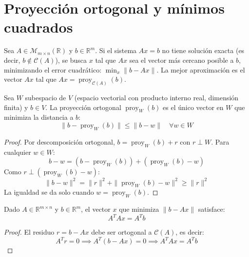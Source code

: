 \section{Proyección ortogonal y mínimos cuadrados}

\begin{definition}
Sea $A \in \mathcal{M}_{m \times n}(\mathbb{R})$ y $b \in \mathbb{R}^m$. Si el sistema $Ax = b$ no tiene solución exacta (es decir, $b \notin \mathcal{C}(A)$), se busca $x$ tal que $Ax$ sea el vector más cercano posible a $b$, minimizando el error cuadrático: \(
\min_{x} \|b - Ax\|
.\) La mejor aproximación es el vector $Ax$ tal que $Ax = \operatorname{proy}_{\mathcal{C}(A)}(b)$.
\end{definition}

\begin{theorem}
Sea $W$ subespacio de $V$ (espacio vectorial con producto interno real, dimensión finita) y $b \in V$. La proyección ortogonal $\operatorname{proy}_W(b)$ es el único vector en $W$ que minimiza la distancia a $b$:
\[
\|b - \operatorname{proy}_W(b)\| \leq \|b - w\| \quad \forall w \in W
\]
\begin{proof}
Por descomposición ortogonal, $b = \operatorname{proy}_W(b) + r$ con $r \perp W$. Para cualquier $w \in W$:
\[
b - w = (b - \operatorname{proy}_W(b)) + (\operatorname{proy}_W(b) - w)
\]
Como $r \perp (\operatorname{proy}_W(b) - w)$:
\[
\|b - w\|^2 = \|r\|^2 + \|\operatorname{proy}_W(b) - w\|^2 \geq \|r\|^2
\]
La igualdad se da solo cuando $w = \operatorname{proy}_W(b)$.
\end{proof}
\end{theorem}

\begin{theorem}
Dado $A \in \mathbb{R}^{m \times n}$ y $b \in \mathbb{R}^m$, el vector $x$ que minimiza $\|b - Ax\|$ satisface:
\[
A^T A x = A^T b
\]
\begin{proof}
El residuo $r = b - Ax$ debe ser ortogonal a $\mathcal{C}(A)$, es decir:
\[
A^T r = 0 \implies A^T(b - Ax) = 0 \implies A^T A x = A^T b
\]
\end{proof}
\end{theorem}

